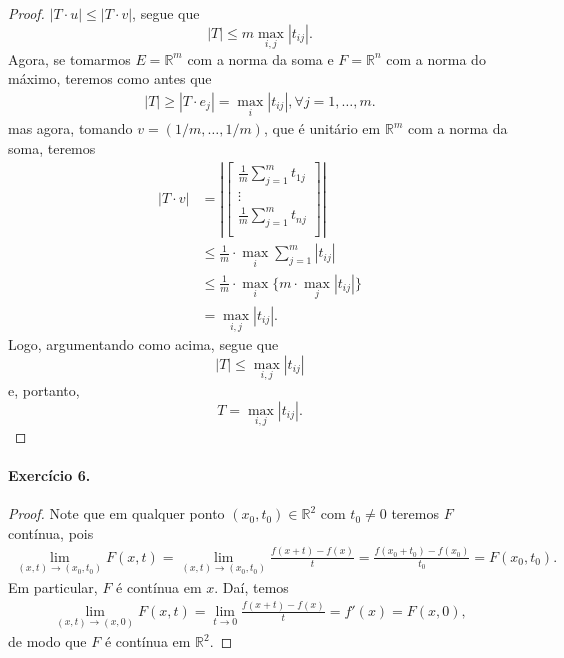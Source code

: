 \documentclass[12pt,a4paper]{article}
\newcommand{\R}{\mathbb{R}}
\begin{document}
\begin{proof}
        $|T\cdot u| \leq |T\cdot v|$, segue que
        \begin{equation*}
            |T| \leq m \max_{i,j}|t_{ij}|.
        \end{equation*}
        Agora, se tomarmos $E = \R^m$ com a norma da soma e $F = \R^n$ com
        a norma do máximo, teremos como antes que
        \begin{align*}
            |T| \geq |T\cdot e_j| = \max_i |t_{ij}|, \forall j = 1, \dots, m.
        \end{align*}
        mas agora, tomando $v = (1/m, \dots, 1/m)$, que é unitário em $\R^m$ 
        com a norma da soma, teremos
        \begin{align*}
            |T \cdot v|
            &= \left|\begin{bmatrix}
                \displaystyle{\frac{1}{m}\sum_{j=1}^m t_{1j}} \\
                \vdots \\
                \displaystyle{\frac{1}{m}\sum_{j=1}^m t_{nj}} \\
            \end{bmatrix}\right| \\
            &\leq \frac{1}{m}\cdot\max_i \displaystyle{\sum_{j=1}^m |t_{ij}|} \\
            &\leq \frac{1}{m}\cdot\max_i \{m\cdot\max_j |t_{ij}|\} \\
            &= \max_{i,j} |t_{ij}|.
        \end{align*}
        Logo, argumentando como acima, segue que
        \begin{equation*}
            |T| \leq \max_{i,j} |t_{ij}|
        \end{equation*}
        e, portanto,
        \begin{equation*}
            T = \max_{i,j} |t_{ij}|.
        \end{equation*}
    \end{proof}
\paragraph{Exercício 6.}
    \begin{proof}
        Note que em qualquer ponto $(x_0, t_0)\in\R^2$ com $t_0\neq 0$ teremos
        $F$ contínua, pois
        \begin{align*}
            \lim_{(x,t)\to (x_0,t_0)} F(x,t)
            = \lim_{(x,t)\to (x_0,t_0)} \frac{f(x+t) - f(x)}{t}
            = \frac{f(x_0+t_0) - f(x_0)}{t_0}
            = F(x_0, t_0).
        \end{align*}
        Em particular, $F$ é contínua em $x$. Daí, temos
        \begin{align*}
            \lim_{(x,t) \to (x, 0)} F(x,t)
            = \lim_{t\to 0} \frac{f(x+t) - f(x)}{t}
            = f'(x)
            = F(x,0),
        \end{align*}
        de modo que $F$ é contínua em $\R^2$.
    \end{proof}
\end{document}
